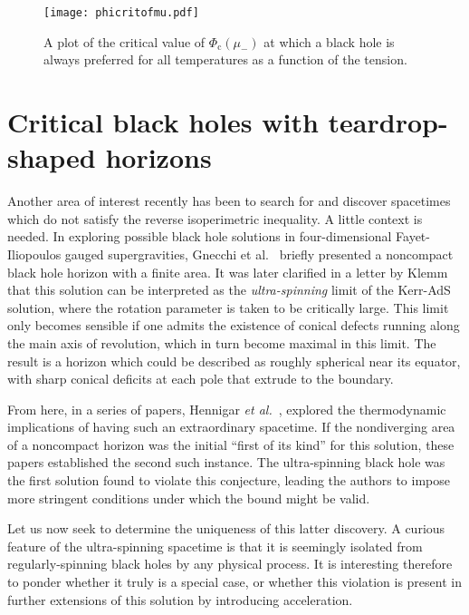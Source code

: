 \documentclass[
twoside,
openright,
frontopenright,
]{dmathesis}
\begin{document}
\begin{figure} 
  \centering
  \texttt{[image: phicritofmu.pdf]}
  \caption{\label{fig:phicrit}A plot of the critical value of $\Phi_\mathrm{c}(\mu_-)$ at
    which a black hole is always preferred for all temperatures as a function of
    the tension.}
\end{figure}


\section{Critical black holes with teardrop-shaped horizons}
\label{cha:crit-bh}

Another area of interest recently has been to search for and discover spacetimes
which do not satisfy the reverse isoperimetric inequality. A little context is
needed. In exploring possible black hole solutions in four-dimensional
Fayet-Iliopoulos gauged supergravities, Gnecchi et al.~\cite{Gnecchi:2013mja}
briefly presented a noncompact black hole horizon with a finite area. It was
later clarified in a letter by Klemm~\cite{Klemm:2014rda} that this solution can
be interpreted as the \emph{ultra-spinning} limit of the Kerr-AdS solution,
where the rotation parameter is taken to be critically large. This limit only
becomes sensible if one admits the existence of conical defects running along
the main axis of revolution, which in turn become maximal in this limit. The
result is a horizon which could be described as roughly spherical near its
equator, with sharp conical deficits at each pole that extrude to the boundary.

From here, in a series of papers, Hennigar \emph{et
  al.}~\cite{Hennigar:2015gan,Hennigar:2014cfa,Hennigar:2015cja}, explored the
thermodynamic implications of having such an extraordinary spacetime. If the
nondiverging area of a noncompact horizon was the initial ``first of its kind''
for this solution, these papers established the second such instance. The
ultra-spinning black hole was the first solution found to violate this
conjecture, leading the authors to impose more stringent conditions under which
the bound might be valid.

Let us now seek to determine the uniqueness of this latter discovery. A curious
feature of the ultra-spinning spacetime is that it is seemingly isolated from
regularly-spinning black holes by any physical process. It is interesting
therefore to ponder whether it truly is a special case, or whether this
violation is present in further extensions of this solution by introducing
acceleration.
\end{document}
